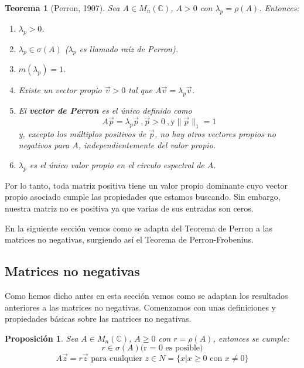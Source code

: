 \documentclass[size=a4, parskip=half, titlepage=false, toc=flat, toc=bib, 12pt]{scrartcl}
\theoremstyle{theorem-style}
\newtheorem{nth}{Teorema}[section]
\newtheorem{nprop}{Proposición}[section]
\theoremstyle{definition-style}
\theoremstyle{remark-style}
\theoremstyle{example-style}
\theoremstyle{definition-style}
\theoremstyle{remark-style}
\begin{document}
\begin{nth}[Perron, 1907]
Sea $A \in M_n(\mathbb{C})$, $A > 0$ con $\lambda_p = \rho(A)$. Entonces:
\begin{enumerate}
\item $\lambda_p >0$.
\item $\lambda_p \in \sigma(A)$ ($\lambda_p$ es llamado raíz de Perron).
\item $m(\lambda_p) = 1$.
\item Existe un vector propio $\vec{v} >0$ tal que $A\vec{v} = \lambda_p \vec{v}$.
\item El \textbf{vector de Perron} es el único definido como
$$A\vec{p} = \lambda_p \vec{p} \ , \vec{p} > 0 \ , \textrm{y} \|\vec{p}\|_1 = 1 $$
y, excepto los múltiplos positivos de $\vec{p}$, no hay otros vectores propios no negativos para $A$, independientemente del valor propio.
\item $\lambda_p$ es el único valor propio en el circulo espectral de $A$.
\end{enumerate}
\end{nth}

Por lo tanto, toda matriz positiva tiene un valor propio dominante cuyo vector propio asociado cumple las propiedades que estamos buscando. Sin embargo, nuestra matriz no es positiva ya que varias de sus entradas son ceros.

En la siguiente sección vemos como se adapta del Teorema de Perron a las matrices no negativas, surgiendo así el Teorema de Perron-Frobenius.

\subsection{Matrices no negativas}

Como hemos dicho antes en esta sección vemos como se adaptan los resultados anteriores a las matrices no negativas. Comenzamos con unas definiciones y propiedades básicas sobre las matrices no negativas.

\begin{nprop}
Sea $A \in M_n(\mathbb{C})$, $A \geq 0$ con $r = \rho(A)$, entonces se cumple:
\begin{equation} r \in \sigma(A) \textrm{(r = 0 es posible)} \end{equation}
\begin{equation} \label{vectorpropio} A\vec{z} = r\vec{z} \textrm{ para cualquier } z \in N = \{x | x \geq 0 \textrm{ con } x \neq 0 \} \end{equation}
\end{nprop}
\end{document}
